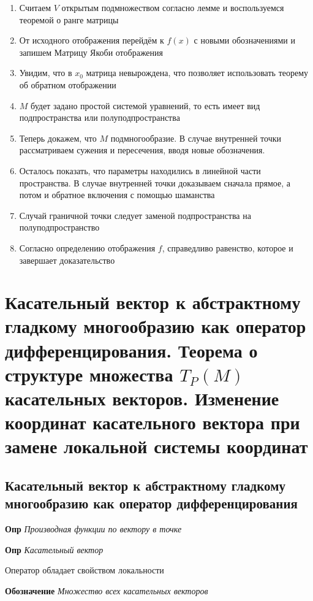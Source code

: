 \documentclass[a4paper, 14pt]{article}
\begin{document}
    \begin{enumerate}
        \item Считаем $V$ открытым подмножеством согласно лемме и воспользуемся теоремой о ранге матрицы
        \item От исходного отображения перейдём к $f(x)$ с новыми обозначениями и запишем Матрицу Якоби отображения
        \item Увидим, что в $x_0$ матрица невырождена, что позволяет использовать теорему об обратном отображении
        \item $M$ будет задано простой системой уравнений, то есть имеет вид подпространства или полуподпространства
        \item Теперь докажем, что $M$ подмногообразие.
        В случае внутренней точки рассматриваем сужения и пересечения, вводя новые обозначения.
        \item Осталось показать, что параметры находились в линейной части пространства.
        В случае внутренней точки доказываем сначала прямое, а потом и обратное включения с помощью шаманства
        \item Случай граничной точки следует заменой подпространства на полуподпространство
        \item Согласно определению отображения $f$, справедливо равенство, которое и завершает доказательство
    \end{enumerate}
    
    \section{Касательный вектор к абстрактному гладкому многообразию как оператор дифференцирования.
    Теорема о структуре множества $T_P (M)$ касательных векторов.
    Изменение координат касательного вектора при замене локальной системы координат}
    
    \subsection{Касательный вектор к абстрактному гладкому многообразию как оператор дифференцирования}
    
    \textbf{Опр} \textit{Производная функции по вектору в точке}
    
    \textbf{Опр} \textit{Касательный вектор}
    
    Оператор обладает свойством локальности
    
    \textbf{Обозначение} \textit{Множество всех касательных векторов}
    
\end{document}
